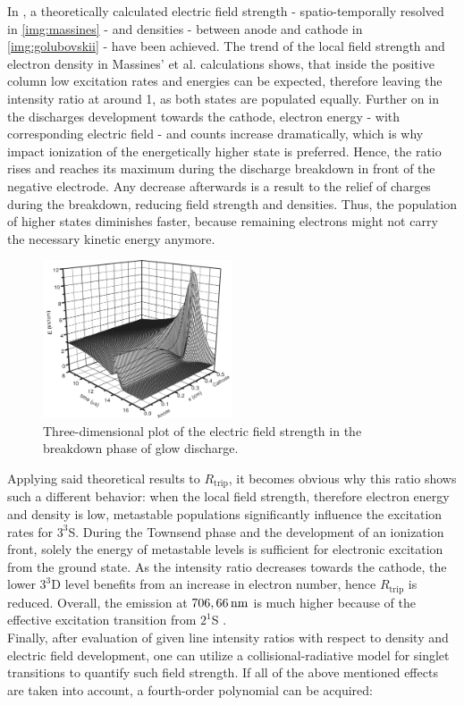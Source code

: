 \documentclass[a4paper,10pt,twoside]{article}
\newcommand{\ix}[1]{_\text{#1}}
\begin{document}
		In \cite{Massines}, \cite{0022-3727-36-1-306} a theoretically calculated electric field \newline 	strength - spatio-temporally resolved in \autoref{img:massines} - and densities - between anode and cathode in \autoref{img:golubovskii} - have been achieved. The trend of the local field strength and electron density in Massines' et al. calculations shows, that inside the positive column low excitation rates and energies can be expected, therefore leaving the intensity ratio at around 1, as both states are populated equally. Further on in the discharges development towards the cathode, electron energy - with corresponding electric field - and counts increase dramatically, which is why impact ionization of the energetically higher state is preferred. Hence, the ratio rises and reaches its maximum during the discharge breakdown in front of the negative electrode. Any decrease afterwards is a result to the relief of charges during the breakdown, reducing field strength and densities. Thus, the population of higher states diminishes faster, because remaining electrons might not carry the necessary kinetic energy anymore.
		
			\begin{figure}[t!]
				\centering
				\includegraphics[width=0.5\textwidth]{figures/lineratio/golubovskiip47fig9}
				\caption{Three-dimensional plot of the electric field strength in the breakdown phase of glow discharge. \cite{0022-3727-36-1-306}}
				\label{img:golubovskii}
			\end{figure}
		
		Applying said theoretical results to $R\ix{trip}$, it becomes obvious why this ratio shows such a different behavior: when the local field strength, therefore electron energy and density is low, metastable populations significantly influence the excitation rates for $3^3$S. During the Townsend phase and the development of an ionization front, solely the energy of metastable levels is sufficient for electronic excitation from the ground state. As the intensity ratio decreases towards the cathode, the lower $3^3$D level benefits from an increase in electron number, hence $R\ix{trip}$ is reduced. Overall, the emission at $\unit[706,66]{nm}$ is much higher because of the effective excitation transition from $2^1$S \cite{linratio1_14}.\\
		Finally, after evaluation of given line intensity ratios with respect to density and electric field development, one can utilize a collisional-radiative model for singlet transitions \cite{linratio1_14} to quantify such field strength. If all of the above mentioned effects are taken into account, a fourth-order polynomial can be acquired:
		
\end{document}
